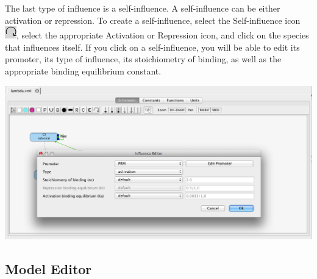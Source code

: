 \documentclass[titlepage,11pt]{article}
\begin{document}
The last type of influence is a self-influence.  A self-influence can be either activation or repression.  To create a self-influence, select the Self-influence icon \includegraphics{../gui/icons/modelview/self_influence_selected}, select the appropriate Activation or Repression icon, and click on the species that influences itself.  If you click on a self-influence, you will be able to edit its promoter, its type of influence, its stoichiometry of binding, as well as the appropriate binding equilibrium constant. 

\begin{center}
\includegraphics[width=160mm]{screenshots/selfInfluence}
\end{center}

\clearpage

\subsection{\label{ModelEditor}Model Editor}
\end{document}
